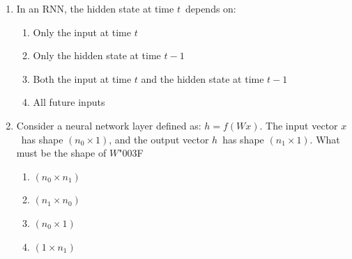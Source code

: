 \documentclass[12pt]{article}
\begin{document}
\begin{enumerate}[label=Q\arabic*.]
\begin{enumerate}[label=(\Alph*)]
    \item The next word given the predicted history
    \item The next word given the ground-truth history
    \item The current word given itself
    \item All words simultaneously
\end{enumerate}
\item In an RNN, the hidden state at time $t$\ depends on:
\begin{enumerate}[label=(\Alph*)]
    \item Only the input at time $t$
    \item Only the hidden state at time $t-1$
    \item Both the input at time $t$ and the hidden state at time $t-1$
    \item All future inputs
\end{enumerate}
\item Consider a neural network layer defined as: $h = f(Wx)$. The input vector $x$\ has shape $(n_0 \times 1)$, and the output vector $h$\ has shape $(n_1 \times 1)$. What must be the shape of $W${\char"003F}
\begin{enumerate}[label=(\Alph*)]
    \item $(n_0 \times n_1)$
    \item $(n_1 \times n_0)$
    \item $(n_0 \times 1)$
    \item $(1 \times n_1)$
\end{enumerate}

\end{enumerate}
\end{document}
